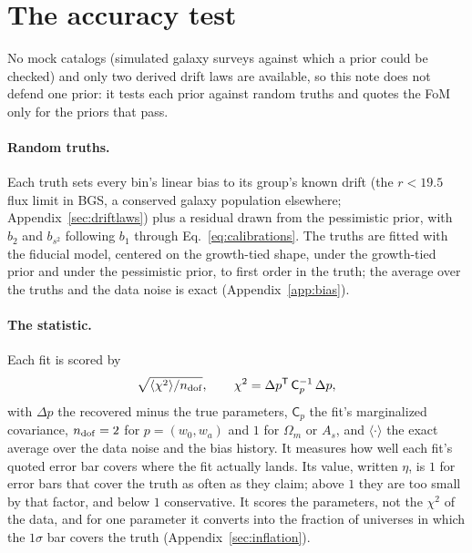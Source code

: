 \documentclass[11pt]{article}
\newcommand{\T}{^{\mathsf{T}}}
\newcommand{\chidof}{\sqrt{\langle \chi^2 \rangle / n_{\rm dof}}}
\newcommand{\bstwo}{b_{s^2}}
\begin{document}
\section{The accuracy test}
\label{sec:accuracy}

No mock catalogs (simulated galaxy surveys against which a prior
could be checked) and only two derived drift laws are available, so
this note does not defend one prior: it tests each prior against
random truths and quotes the FoM only for the priors that pass.

\paragraph{Random truths.}
Each truth sets every bin's linear bias to its group's known drift
(the $r < 19.5$ flux limit in BGS, a conserved galaxy population
elsewhere; Appendix~\ref{sec:driftlaws}) plus a residual drawn from
the pessimistic prior, with $b_2$ and $\bstwo$ following $b_1$ through
Eq.~\eqref{eq:calibrations}.  The truths are fitted with
the fiducial model, centered on the growth-tied shape, under the
growth-tied prior and under the pessimistic prior, to first order in
the truth; the average over the truths and the data noise is exact
(Appendix~\ref{app:bias}).

\paragraph{The statistic.}
Each fit is scored by
\begin{equation}
  \chidof ,
  \qquad
  \chi^2 = \Delta p\T\, \mathsf{C}_p^{-1}\, \Delta p ,
  \label{eq:gof}
\end{equation}
with $\Delta p$ the recovered minus the true parameters,
$\mathsf{C}_p$ the fit's marginalized covariance, $n_{\rm dof} = 2$
for $p = (w_0, w_a)$ and $1$ for $\Omega_m$ or $A_s$, and
$\langle\cdot\rangle$ the exact average over the data noise and the
bias history.  It measures how well each fit's quoted error bar covers
where the fit actually lands.  Its value, written $\eta$, is $1$ for
error bars that cover the truth as often as they claim; above $1$ they
are too small by that factor, and below $1$ conservative.  It scores
the parameters, not the $\chi^2$ of the data, and for one parameter it
converts into the fraction of universes in which the $1\sigma$ bar
covers the truth (Appendix~\ref{sec:inflation}).
\end{document}
